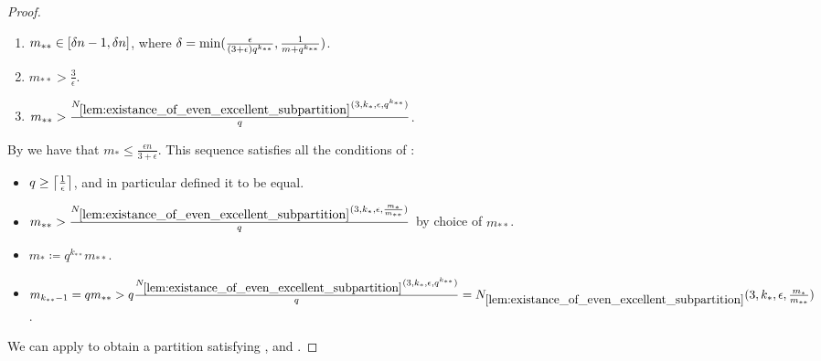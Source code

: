\begin{theorem}
\begin{proof}
\begin{enumerate}[label=(\alph*), ref=\alph*]
                    \item \label{itm:minimal_conditions_for_excellent_partitions.a} $m_{**} \in [ \delta n -1, \delta n ]$, where
                        $\delta = \min ( \frac{\epsilon}{( 3 + \epsilon ) q^{k_{**}}}, \frac{1}{m + q^{k_{**}}} )$.
                    \item \label{itm:minimal_conditions_for_excellent_partitions.b} $m_{**} > \frac{3}{\epsilon}$.
                    \item \label{itm:minimal_conditions_for_excellent_partitions.c} $m_{**} > \frac{N_{\ref{lem:existance_of_even_excellent_subpartition}}
                        ( 3, k_*, \epsilon, q^{k_{**}} )}{q}$.
                \end{enumerate}
                By  we have that $m_* \leq \frac{\epsilon n}{3 + \epsilon}$.
                This sequence satisfies all the conditions of :
                \begin{itemize}[label={}]
                    \item {}
                        $q \geq \left\lceil \frac{1}{\epsilon} \right\rceil$, and in particular defined it to be equal.
                    \item {}
                            $m_{**} > \frac{N_{\ref{lem:existance_of_even_excellent_subpartition}}
                                ( 3, k_*, \epsilon, \frac{m_*}{m_{**}} )}{q}$ by choice of $m_{**}$.
                    \item {}
                        $m_* \coloneqq q^{k_{**}} m_{**}$.
                    \item {} $m_{k_{**}-1} = q m_{**} >
                        q \frac{N_{\ref{lem:existance_of_even_excellent_subpartition}}( 3, k_*, \epsilon, q^{k_{**}} )}{q} =
                        N_{\ref{lem:existance_of_even_excellent_subpartition}}( 3, k_*, \epsilon, \frac{m_*}{m_{**}} )$.
                \end{itemize}
                We can apply  to obtain a partition
                satisfying ,
                 and
                .


\end{proof}
\end{theorem}
